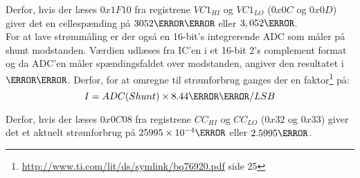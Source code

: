 Derfor, hvis der læses $0x1F10$ fra registrene $VC1_{HI}$ og $VC1_{LO}$ ($0x0C$ og $0x0D$) giver det en cellespænding på $3052\milli\volt$ eller $3,052\volt$.\\

For at lave strømmåling er der også en 16-bit's integrerende ADC som måler på shunt modstanden. Værdien udlæses fra IC'en i et 16-bit 2's complement format og da ADC'en måler spændingsfaldet over modstanden, angiver den resultatet i $\micro\volt$. Derfor, for at omregne til strømforbrug ganges der en faktor\footnote{\url{http://www.ti.com/lit/ds/symlink/bq76920.pdf} side 25} på: 
\begin {equation} 
I = ADC(Shunt) \times 8.44\micro\volt/LSB
\end {equation}

Derfor, hvis der læses $0x0C08$ fra registrene $CC_{HI}$ og $CC_{LO}$ ($0x32$ og $0x33$) giver det et aktuelt strømforbrug på $25995\times10^{-4}\ampere$ eller $2.5995\ampere$.